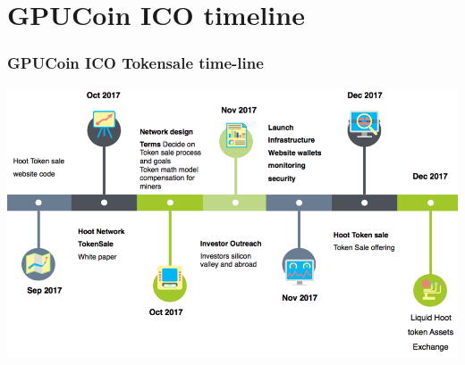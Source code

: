 \documentclass[10pt,handout]{beamer}
\begin{document}
\section{GPUCoin ICO timeline}
\begin{frame}[t]\frametitle{GPUCoin ICO Tokensale time-line}
 \includegraphics[width=1.0\textwidth]{static/tstimeline-trans}
\end{frame}
\end{document}
